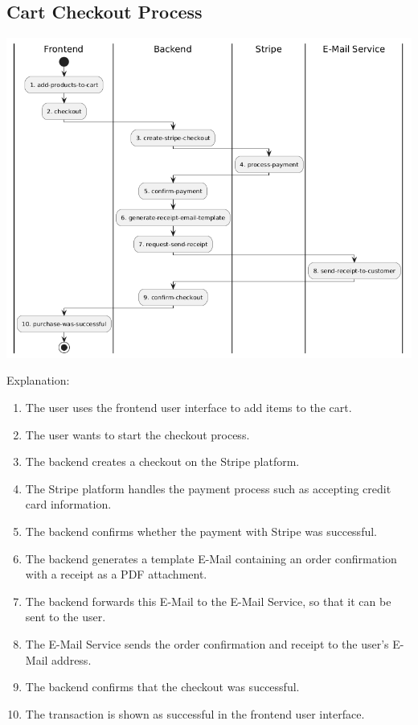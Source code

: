 \hypertarget{__runtime_scenario_2}{%
\subsection{Cart Checkout Process}\label{__runtime_scenario_2}}
\includegraphics{images/uml_swimlane_checkout.png}

Explanation:
\begin{enumerate}
  \item The user uses the frontend user interface to add items to the cart.
  \item The user wants to start the checkout process.
  \item The backend creates a checkout on the Stripe platform.
  \item The Stripe platform handles the payment process such as accepting credit card information.
  \item The backend confirms whether the payment with Stripe was successful.
  \item The backend generates a template E-Mail containing an order confirmation with a receipt as a PDF attachment.
  \item The backend forwards this E-Mail to the E-Mail Service, so that it can be sent to the user.
  \item The E-Mail Service sends the order confirmation and receipt to the user's E-Mail address.
  \item The backend confirms that the checkout was successful.
  \item The transaction is shown as successful in the frontend user interface.
\end{enumerate}

